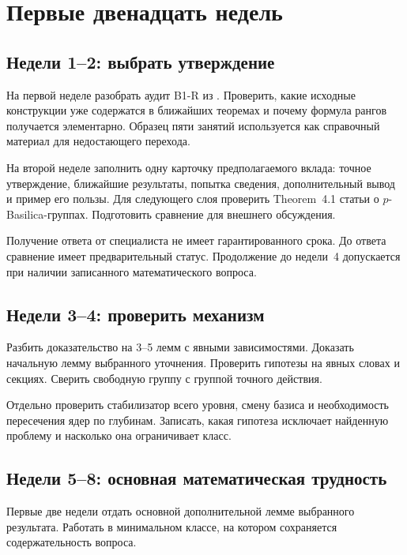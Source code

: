 \chapter{Первые двенадцать недель}

\section{Недели 1--2: выбрать утверждение}
На первой неделе разобрать аудит B1-R из .
Проверить, какие исходные конструкции уже содержатся в ближайших
теоремах и почему формула рангов получается элементарно.
Образец пяти занятий используется как справочный материал для
недостающего перехода.

На второй неделе заполнить одну карточку предполагаемого вклада:
точное утверждение, ближайшие результаты, попытка сведения,
дополнительный вывод и пример его пользы.
Для следующего слоя проверить Theorem~4.1 статьи о
\(p\)-Basilica-группах. Подготовить сравнение для внешнего обсуждения.


Получение ответа от специалиста не имеет гарантированного срока.
До ответа сравнение имеет предварительный статус. Продолжение до
недели~4 допускается при наличии записанного математического вопроса.

\section{Недели 3--4: проверить механизм}
Разбить доказательство на 3--5 лемм с явными зависимостями.
Доказать начальную лемму выбранного уточнения. Проверить гипотезы на явных словах и секциях.
Сверить свободную группу с группой точного действия.

Отдельно проверить стабилизатор всего уровня, смену базиса
и необходимость пересечения ядер по глубинам. Записать, какая гипотеза
исключает найденную проблему и насколько она ограничивает класс.


\section{Недели 5--8: основная математическая трудность}
Первые две недели отдать основной дополнительной лемме выбранного результата. Работать в минимальном классе,
на котором сохраняется содержательность вопроса.

